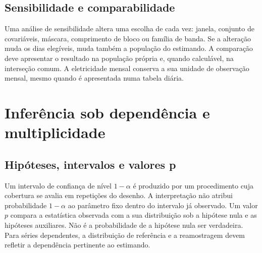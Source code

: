 \subsection{Sensibilidade e comparabilidade}
\label{sec:mat-sensibilidade}
Uma análise de sensibilidade altera uma escolha de cada vez: janela, conjunto de covariáveis, máscara, comprimento de bloco ou família de banda. Se a alteração muda os dias elegíveis, muda também a população do estimando. A comparação deve apresentar o resultado na população própria e, quando calculável, na interseção comum. A eletricidade mensal conserva a sua unidade de observação mensal, mesmo quando é apresentada numa tabela diária.


\section{Inferência sob dependência e multiplicidade}
\label{sec:mat-inferencia}

\subsection{Hipóteses, intervalos e valores p}
\label{sec:mat-interpretacao-inferencia}
Um intervalo de confiança de nível $1-\alpha$ é produzido por um procedimento cuja cobertura se avalia em repetições do desenho. A interpretação não atribui probabilidade $1-\alpha$ ao parâmetro fixo dentro do intervalo já observado. Um valor $p$ compara a estatística observada com a sua distribuição sob a hipótese nula e as hipóteses auxiliares. Não é a probabilidade de a hipótese nula ser verdadeira. Para séries dependentes, a distribuição de referência e a reamostragem devem refletir a dependência pertinente ao estimando.


